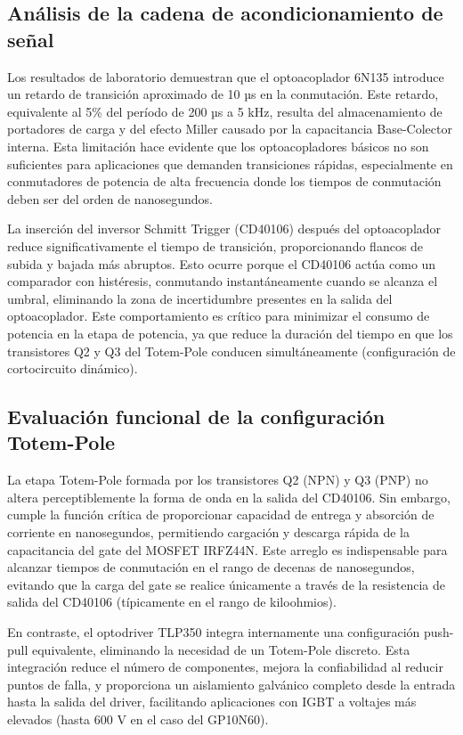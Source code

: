 \documentclass[12pt]{article}
\begin{document}
\subsection{Análisis de la cadena de acondicionamiento de señal}

Los resultados de laboratorio demuestran que el optoacoplador 6N135 introduce un retardo de transición aproximado de 10 µs en la conmutación. Este retardo, equivalente al 5\% del período de 200 µs a 5 kHz, resulta del almacenamiento de portadores de carga y del efecto Miller causado por la capacitancia Base-Colector interna. Esta limitación hace evidente que los optoacopladores básicos no son suficientes para aplicaciones que demanden transiciones rápidas, especialmente en conmutadores de potencia de alta frecuencia donde los tiempos de conmutación deben ser del orden de nanosegundos.

La inserción del inversor Schmitt Trigger (CD40106) después del optoacoplador reduce significativamente el tiempo de transición, proporcionando flancos de subida y bajada más abruptos. Esto ocurre porque el CD40106 actúa como un comparador con histéresis, conmutando instantáneamente cuando se alcanza el umbral, eliminando la zona de incertidumbre presentes en la salida del optoacoplador. Este comportamiento es crítico para minimizar el consumo de potencia en la etapa de potencia, ya que reduce la duración del tiempo en que los transistores Q2 y Q3 del Totem-Pole conducen simultáneamente (configuración de cortocircuito dinámico).

\subsection{Evaluación funcional de la configuración Totem-Pole}

La etapa Totem-Pole formada por los transistores Q2 (NPN) y Q3 (PNP) no altera perceptiblemente la forma de onda en la salida del CD40106. Sin embargo, cumple la función crítica de proporcionar capacidad de entrega y absorción de corriente en nanosegundos, permitiendo cargación y descarga rápida de la capacitancia del gate del MOSFET IRFZ44N. Este arreglo es indispensable para alcanzar tiempos de conmutación en el rango de decenas de nanosegundos, evitando que la carga del gate se realice únicamente a través de la resistencia de salida del CD40106 (típicamente en el rango de kiloohmios).

En contraste, el optodriver TLP350 integra internamente una configuración push-pull equivalente, eliminando la necesidad de un Totem-Pole discreto. Esta integración reduce el número de componentes, mejora la confiabilidad al reducir puntos de falla, y proporciona un aislamiento galvánico completo desde la entrada hasta la salida del driver, facilitando aplicaciones con IGBT a voltajes más elevados (hasta 600 V en el caso del GP10N60).
\end{document}
